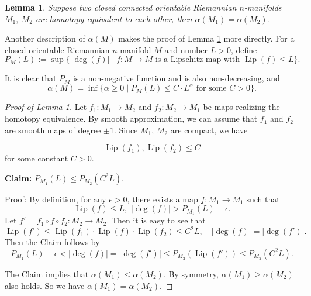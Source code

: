 \documentclass{amsart}
\newcommand{\ra}{\rightarrow}
\newcommand{\lip}{\operatorname{Lip}}
\newcommand{\vol}{\operatorname{Vol}}
\newtheorem{lem}[thm]{Lemma}
\begin{document}
\begin{lem}\label{homotopy}
    Suppose two closed connected orientable Riemannian $n$-manifolds $M_1,\ M_2$ are homotopy equivalent to each other, then $\alpha(M_1)=\alpha(M_2)$.
    \end{lem} 
    
    Another description of $\alpha(M)$ makes the proof of Lemma \ref{homotopy} more directly.
    For a closed orientable Riemannian $n$-manifold $M$  and number  $L>0$, define 
    \[
        P_{M}(L):=\sup \{|\deg (f)|\mid f:M\ra M \text{ is a Lipschitz map with }\lip (f)\leqslant L\}.
    \]
    
  It is clear that $P_{M}$ is a non-negative function and is also non-decreasing, and
  \[
        \alpha(M)=\inf\{\alpha\geqslant 0\mid P_M(L)\leqslant C\cdot L^\alpha \text{ for some $C>0$}\}.
    \]


\begin{proof}[Proof of Lemma \ref{homotopy}]
 

 

    

 Let $f_1: M_1\to M_2$ and $f_2: M_2\to M_1$ be maps realizing the homotopy equivalence. 
By smooth approximation, we can assume that  $f_1$ and $f_2$ are smooth maps of degree $\pm 1$.
Since $M_1$, $M_2$ are compact, we have 

\[\lip (f_1), \lip (f_2)\le  C\] for some constant $C>0$.

{\bf Claim:} $P_{M_1} (L)\le P_{M_2}(C^2L)$. 

Proof: By definition, for any $\epsilon>0$, there exists a map $f: M_1\to M_1$ such that \[\lip (f)\le L, \,\, |\deg (f)|>P_{M_1} (L)-\epsilon.\]
Let $f'=f_1\circ f\circ f_2 : M_2\to M_2$. Then it is easy to see that 
    \[
        \lip  (f')\leqslant \lip (f_1)\cdot \lip (f) \cdot  \lip (f_2) \le C^2 L, \quad  |\deg (f)|=|\deg (f')|.
    \]
    Then  the Claim follows by 
    \[P_{M_1} (L)-\epsilon<|\deg (f)|=|\deg (f')|   \le P_{M_2}(\lip (f')) \le P_{M_2}(C^2L).\]
   
    
    The Claim implies that $\alpha(M_1)\le \alpha(M_2)$.
    By symmetry, $\alpha(M_1)\ge \alpha(M_2)$ also holds. So we have $\alpha(M_1)= \alpha(M_2)$.
     \end{proof}
  
\end{document}
